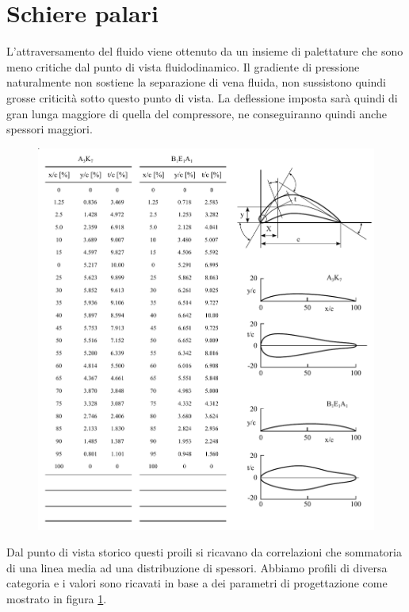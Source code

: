 \section{Schiere palari}
L'attraversamento del fluido viene ottenuto da un insieme di palettature che sono meno critiche dal punto di vista fluidodinamico. Il gradiente di pressione naturalmente non sostiene la separazione di vena fluida, non sussistono quindi grosse criticità sotto questo punto di vista. La deflessione imposta sarà quindi di gran lunga maggiore di quella del compressore, ne conseguiranno quindi anche spessori maggiori. 
\begin{figure}
\centering
  \includegraphics[width=\textwidth]{fig/SchierePaleTab.pdf}
\caption{}
\label{fig:SchierePaleTab}
\end{figure}
Dal punto di vista storico questi proili si ricavano da correlazioni che  sommatoria di una linea media ad una distribuzione di spessori. Abbiamo profili di diversa categoria e i valori sono ricavati in base a dei parametri di progettazione come mostrato in figura \ref{fig:SchierePaleTab}.

